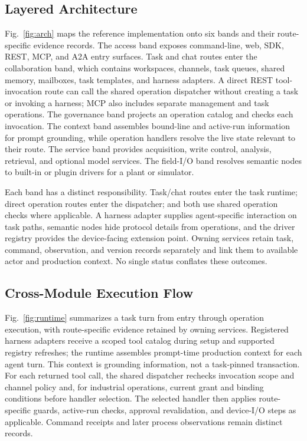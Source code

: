 \subsection{Layered Architecture}
\label{sec:layers}
\label{sec:arch}
Fig.~\ref{fig:arch} maps the reference implementation onto six bands and
their route-specific evidence records. The access band exposes command-line,
web, SDK, REST, MCP, and A2A entry surfaces. Task and chat routes enter the
collaboration band, which contains workspaces, channels, task queues, shared
memory, mailboxes, task templates, and harness adapters. A direct REST
tool-invocation route can call the shared operation dispatcher without
creating a task or invoking a harness; MCP also includes separate management
and task operations. The governance band projects an operation catalog and
checks each invocation. The context band assembles bound-line and active-run
information for prompt grounding, while operation handlers resolve the live
state relevant to their route. The service band provides acquisition, write
control, analysis, retrieval, and optional model services. The field-I/O band
resolves semantic nodes to built-in or plugin drivers for a plant or
simulator.

Each band has a distinct responsibility. Task/chat routes enter the task
runtime; direct operation routes enter the dispatcher; and both use shared
operation checks where applicable. A harness adapter supplies
agent-specific interaction on task paths, semantic nodes hide protocol
details from operations, and the driver registry provides the device-facing
extension point. Owning services retain task, command, observation, and
version records separately and link them to available actor and production
context. No single status conflates these outcomes.

\subsection{Cross-Module Execution Flow}
\label{sec:executionflow}
Fig.~\ref{fig:runtime} summarizes a task turn from entry through operation
execution, with route-specific evidence retained by owning services. Registered
harness adapters receive a scoped tool catalog during setup and supported
registry refreshes; the runtime assembles prompt-time production context for
each agent turn. This context is grounding information, not a task-pinned
transaction. For each returned tool call, the shared dispatcher rechecks
invocation scope and channel policy and, for industrial operations, current
grant and binding conditions before handler selection. The selected handler
then applies route-specific guards, active-run checks, approval
revalidation, and device-I/O steps as applicable. Command receipts and later
process observations remain distinct records.

